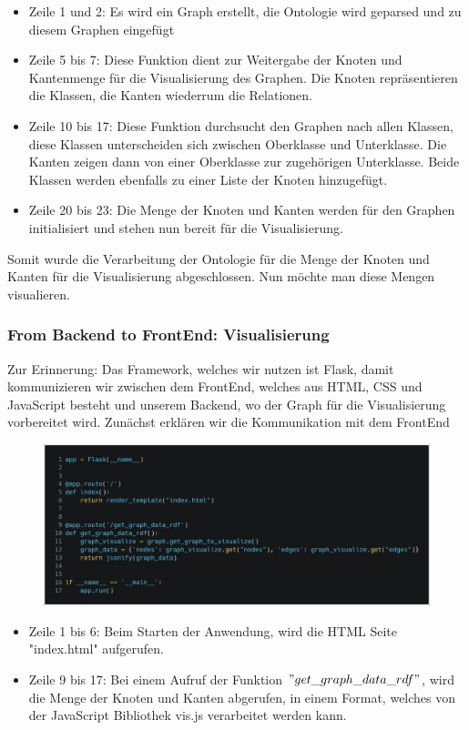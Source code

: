 \begin{itemize}
    \item Zeile 1 und 2: Es wird ein Graph erstellt, die Ontologie wird geparsed und zu diesem Graphen eingefügt
    \item Zeile 5 bis 7: Diese Funktion dient zur Weitergabe der Knoten und Kantenmenge für die Visualisierung des Graphen. Die Knoten repräsentieren die Klassen, die Kanten wiederrum die Relationen.
    \item Zeile 10 bis 17: Diese Funktion durchsucht den Graphen nach allen Klassen, diese Klassen unterscheiden sich zwischen Oberklasse und Unterklasse. Die Kanten zeigen dann von einer Oberklasse zur zugehörigen Unterklasse. Beide Klassen werden ebenfalls zu einer Liste der Knoten hinzugefügt.
    \item Zeile 20 bis 23: Die Menge der Knoten und Kanten werden für den Graphen initialisiert und stehen nun bereit für die Visualisierung.
\end{itemize}

Somit wurde die Verarbeitung der Ontologie für die Menge der Knoten und Kanten für die Visualisierung abgeschlossen. Nun möchte man diese Mengen visualieren.

\subsubsection*{From Backend to FrontEnd: Visualisierung}

Zur Erinnerung: Das Framework, welches wir nutzen ist Flask, damit kommunizieren wir zwischen dem FrontEnd, welches aus HTML, CSS und JavaScript besteht und unserem Backend, wo der Graph für die Visualisierung vorbereitet wird.
Zunächst erklären wir die Kommunikation mit dem FrontEnd
\begin{figure}[!ht]
    \includegraphics[scale=0.2]{Graphics/simple_ontology_flask.png}
    \end{figure}
    
\begin{itemize}
    \item Zeile 1 bis 6: Beim Starten der Anwendung, wird die HTML Seite "index.html" aufgerufen.
    \item Zeile 9 bis 17: Bei einem Aufruf der Funktion $"get\_graph\_data\_rdf"$, wird die Menge der Knoten und Kanten abgerufen, in einem Format, welches von der JavaScript Bibliothek vis.js verarbeitet werden kann.
\end{itemize}

